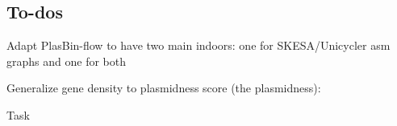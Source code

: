 \subsection*{To-dos}\label{sec:prelude:to-dos}

\begin{todobox}
  Adapt PlasBin-flow to have two main indoors: one for SKESA/Unicycler asm graphs and one for both
\end{todobox}

\begin{todobox}
  Generalize gene density to plasmidness score (the plasmidness):

  \begin{CheckList}{Task}
  \end{CheckList}
\end{todobox}